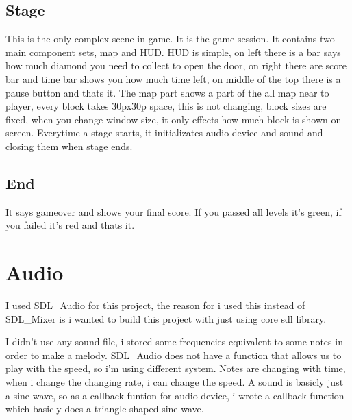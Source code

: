 \documentclass[letterpaper,10pt,english]{sphinxmanual}
\begin{document}
\subsection{Stage}
\label{\detokenize{scenes:stage}}
This is the only complex scene in game. It is the game session. It contains two main
component sets, map and HUD. HUD is simple, on left there is a bar says how much diamond
you need to collect to open the door, on right there are score bar and time bar shows
you how much time left, on middle of the top there is a pause button and thats it.
The map part shows a part of the all map near to player, every block takes 30px30p space,
this is not changing, block sizes are fixed, when you change window size, it only effects
how much block is shown on screen. Everytime a stage starts, it initializates audio device
and sound and closing them when stage ends.


\subsection{End}
\label{\detokenize{scenes:end}}
It says gameover and shows your final score. If you passed all levels it’s green,
if you failed it’s red and thats it.


\section{Audio}
\label{\detokenize{audio:audio}}\label{\detokenize{audio::doc}}
I used SDL\_Audio for this project, the reason for i used this instead of SDL\_Mixer
is i wanted to build this project with just using core sdl library.

I didn’t use any sound file, i stored some frequencies equivalent to some notes in order to
make a melody. SDL\_Audio does not have a function that allows us to play with the speed,
so i’m using different system. Notes are changing with time, when i change the changing rate,
i can change the speed.
A sound is basicly just a sine wave, so as a callback funtion for audio device, i wrote a callback
function which basicly does a triangle shaped sine wave.
\end{document}
